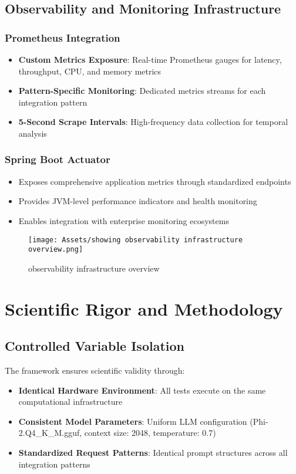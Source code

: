 \subsection{Observability and Monitoring Infrastructure}

\subsubsection{Prometheus Integration}
\begin{itemize}
    \item \textbf{Custom Metrics Exposure}: Real-time Prometheus gauges for latency, throughput, CPU, and memory metrics
    \item \textbf{Pattern-Specific Monitoring}: Dedicated metrics streams for each integration pattern
    \item \textbf{5-Second Scrape Intervals}: High-frequency data collection for temporal analysis
\end{itemize}

\subsubsection{Spring Boot Actuator}
\begin{itemize}
    \item Exposes comprehensive application metrics through standardized endpoints
    \item Provides JVM-level performance indicators and health monitoring
    \item Enables integration with enterprise monitoring ecosystems
\end{itemize}

\begin{figure}[H]
    \centering
    \texttt{[image: Assets/showing observability infrastructure overview.png]}
    \caption{observability infrastructure overview}
\end{figure}


\section{Scientific Rigor and Methodology}

\subsection{Controlled Variable Isolation}

The framework ensures scientific validity through:
\begin{itemize}
    \item \textbf{Identical Hardware Environment}: All tests execute on the same computational infrastructure
    \item \textbf{Consistent Model Parameters}: Uniform LLM configuration (Phi-2.Q4\_K\_M.gguf, context size: 2048, temperature: 0.7)
    \item \textbf{Standardized Request Patterns}: Identical prompt structures across all integration patterns
\end{itemize}

